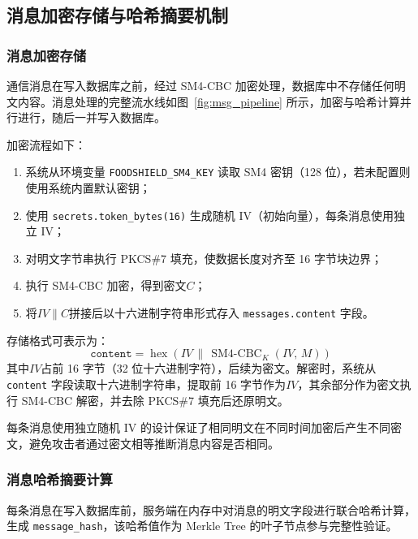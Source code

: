 \subsection{消息加密存储与哈希摘要机制}
\label{subsec:msg_crypto}

\subsubsection*{消息加密存储}

通信消息在写入数据库之前，经过 SM4-CBC 加密处理，数据库中不存储任何明文内容。消息处理的完整流水线如图~\ref{fig:msg_pipeline} 所示，加密与哈希计算并行进行，随后一并写入数据库。



加密流程如下：

\begin{enumerate}[label=\arabic*., leftmargin=2em]
  \item 系统从环境变量 \texttt{FOODSHIELD\_SM4\_KEY} 读取 SM4 密钥（128 位），若未配置则使用系统内置默认密钥；
  \item 使用 \texttt{secrets.token\_bytes(16)} 生成随机 IV（初始向量），每条消息使用独立 IV；
  \item 对明文字节串执行 PKCS\#7 填充，使数据长度对齐至 16 字节块边界；
  \item 执行 SM4-CBC 加密，得到密文$C$；
  \item 将$IV \| C$拼接后以十六进制字符串形式存入 \texttt{messages.content} 字段。
\end{enumerate}

存储格式可表示为：
\[
  \texttt{content} = \operatorname{hex}\!\left(\mathit{IV} \,\|\, \operatorname{SM4\text{-}CBC}_{K}(\mathit{IV},\, M)\right)
\]
其中$\mathit{IV}$占前 16 字节（32 位十六进制字符），后续为密文。解密时，系统从 \texttt{content} 字段读取十六进制字符串，提取前 16 字节作为$\mathit{IV}$，其余部分作为密文执行 SM4-CBC 解密，并去除 PKCS\#7 填充后还原明文。

每条消息使用独立随机 IV 的设计保证了相同明文在不同时间加密后产生不同密文，避免攻击者通过密文相等推断消息内容是否相同。

\subsubsection*{消息哈希摘要计算}

每条消息在写入数据库前，服务端在内存中对消息的明文字段进行联合哈希计算，生成 \texttt{message\_hash}，该哈希值作为 Merkle Tree 的叶子节点参与完整性验证。

